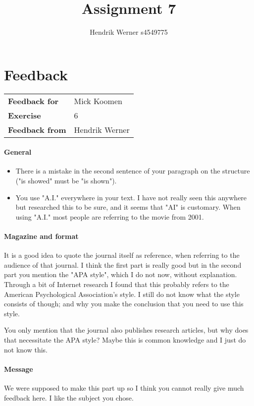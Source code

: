 \documentclass[12pt, a4paper]{article}
\title{Assignment 7}
\author{Hendrik Werner s4549775}
\begin{document}
\maketitle

\clearpage
\section*{Feedback}
\begin{tabular}{l l}
	\textbf{Feedback for} & Mick Koomen\\
	\textbf{Exercise} & 6\\
	\textbf{Feedback from} & Hendrik Werner\\
\end{tabular}

\paragraph{General}
\begin{itemize}
	\item There is a mistake in the second sentence of your paragraph on the structure ("is showed" must be "is shown").
	\item You use "A.I." everywhere in your text. I have not really seen this anywhere but researched this to be sure, and it seems that "AI" is customary. When using "A.I." most people are referring to the movie from 2001.
\end{itemize}

\paragraph{Magazine and format}
It is a good idea to quote the journal itself as reference, when referring to the audience of that journal. I think the first part is really good but in the second part you mention the "APA style", which I do not now, without explanation. Through a bit of Internet research I found that this probably refers to the American Psychological Association's style. I still do not know what the style consists of though; and why you make the conclusion that you need to use this style.

You only mention that the journal also publishes research articles, but why does that necessitate the APA style? Maybe this is common knowledge and I just do not know this.

\paragraph{Message}
We were supposed to make this part up so I think you cannot really give much feedback here. I like the subject you chose.
\end{document}
